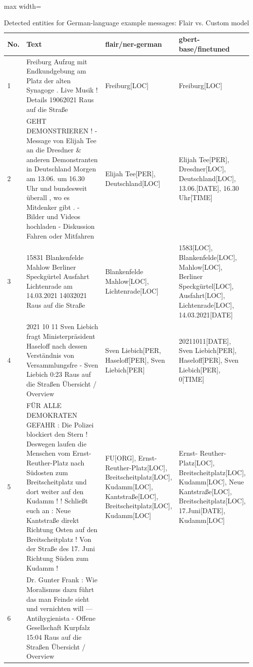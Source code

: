 \begin{table}[htp]
\caption{Detected entities for German-language example messages: Flair vs. Custom model}
\label{tab:detect_ents_de}
\centering
\begin{adjustbox}{max width=\textwidth}
\begin{tabular}{|p{0.04\linewidth}|p{0.6\linewidth}|p{0.3\linewidth}|p{0.35\linewidth}|}
\hline
\textbf{No.} & \textbf{Text} & \textbf{flair/ner-german} & \textbf{gbert-base/finetuned} \\
\hline 
1 
& Freiburg Aufzug mit Endkundgebung am Platz der alten
Synagoge . Live Musik ! Details 19062021 Raus auf die Straße 
& Freiburg[LOC] 
& Freiburg[LOC]\\
\hline
2 
& GEHT DEMONSTRIEREN ! - Message von Elijah Tee an die Dresdner \& anderen Demonstranten in Deutschland Morgen am 13.06. um 16.30 Uhr und bundesweit überall , wo es Mitdenker gibt . - Bilder und Videos hochladen - Diskussion Fahren oder Mitfahren
& Elijah Tee[PER], Deutschland[LOC] 
& Elijah Tee[PER], Dresdner[LOC], Deutschland[LOC], 13.06.[DATE], 16.30 Uhr[TIME]\\ 
\hline
3 
& 15831 Blankenfelde Mahlow Berliner Speckgürtel Ausfahrt Lichtenrade am 14.03.2021 14032021 Raus auf die Straße
& Blankenfelde Mahlow[LOC], Lichtenrade[LOC] 
& 1583[LOC], Blankenfelde[LOC], Mahlow[LOC], Berliner Speckgürtel[LOC], Ausfahrt[LOC], Lichtenrade[LOC], 14.03.2021[DATE]\\
\hline
4 
& 2021 10 11 Sven Liebich fragt Ministerpräsident Haseloff nach dessen Verständnis 
von Versammlungsfre - Sven Liebich 0:23 Raus auf die Straßen  \"Ubersicht / Overview 
& Sven Liebich[PER, Haseloff[PER], Sven Liebich[PER]
& 20211011[DATE], Sven Liebich[PER], Haseloff[PER], Sven Liebich[PER], 0[TIME]\\ 
\hline
5 
& F\"UR ALLE DEMOKRATEN   GEFAHR : Die Polizei blockiert den Stern !   Deswegen laufen die Menschen vom Ernst-Reuther-Platz nach Südosten zum Breitscheitplatz und dort weiter auf den Kudamm ! ! Schließt euch an : Neue Kantstraße direkt Richtung Osten auf den Breitscheitplatz ! Von der Straße des 17. Juni Richtung Süden zum Kudamm ! 
& FU[ORG], Ernst-Reuther-Platz[LOC], Breitscheitplatz[LOC], Kudamm[LOC], Kantstraße[LOC], Breitscheitplatz[LOC], Kudamm[LOC]
& Ernst- Reuther- Platz[LOC], Breitscheitplatz[LOC], Kudamm[LOC], Neue Kantstraße[LOC], Breitscheitplatz[LOC], 17.Juni[DATE], Kudamm[LOC]\\ 
\hline
6 
& Dr. Gunter Frank : Wie Moralismus dazu führt das man Feinde sieht und vernichten will — Antihygienista - Offene Gesellschaft Kurpfalz 15:04 Raus auf die Straßen   \"Ubersicht / Overview 

\end{tabular}
\end{adjustbox}
\end{table}
